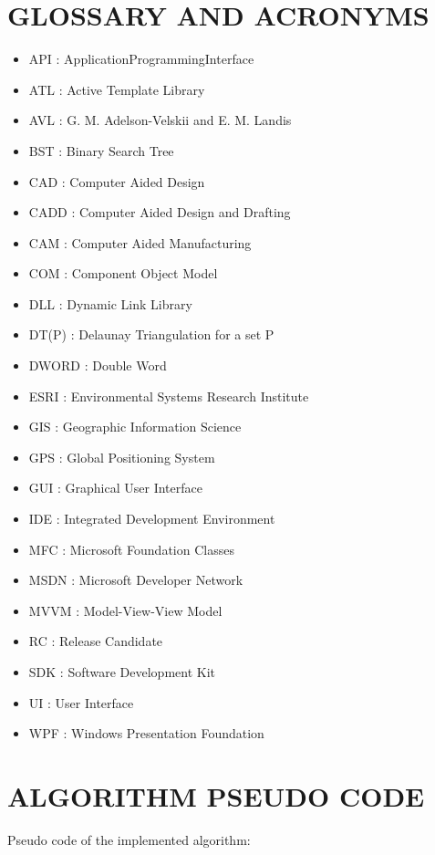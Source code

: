 \appendices
%
%

\chapter{GLOSSARY AND ACRONYMS}

\begin{itemize}
\item API : ApplicationProgrammingInterface
\item ATL : Active Template Library
\item AVL : G. M. Adelson-Velskii and E. M. Landis
\item BST : Binary Search Tree
\item CAD : Computer Aided Design
\item CADD : Computer Aided Design and Drafting
\item CAM : Computer Aided Manufacturing
\item COM : Component Object Model
\item DLL : Dynamic Link Library
\item DT(P) : Delaunay Triangulation for a set P
\item DWORD : Double Word
\item ESRI : Environmental Systems Research Institute
\item GIS : Geographic Information Science
\item GPS : Global Positioning System
\item GUI : Graphical User Interface
\item IDE : Integrated Development Environment
\item MFC : Microsoft Foundation Classes
\item MSDN : Microsoft Developer Network
\item MVVM : Model-View-View Model
\item RC : Release Candidate
\item SDK : Software Development Kit
\item UI : User Interface
\item WPF : Windows Presentation Foundation
\end{itemize}

\chapter{ALGORITHM PSEUDO CODE}

\noindent
Pseudo code of the implemented algorithm: \newline

